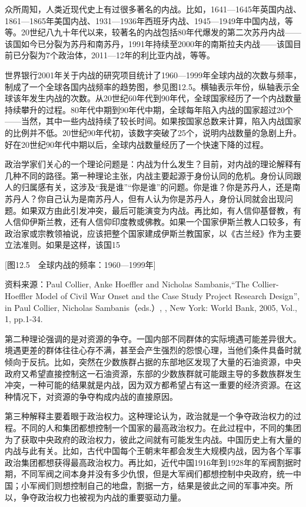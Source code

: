 众所周知，人类近现代史上有过很多著名的内战。比如，1641—1645年英国内战、1861—1865年美国内战、1931—1936年西班牙内战、1945—1949年中国内战，等等。20世纪八九十年代以来，较著名的内战包括80年代爆发的第二次苏丹内战——该国如今已分裂为苏丹和南苏丹，1991年持续至2000年的南斯拉夫内战——该国目前已分裂为7个政治体，2011—12年的利比亚内战，等等。

世界银行2001年关于内战的研究项目统计了1960—1999年全球内战的次数与频率，制成了一个全球各国内战频率的趋势图，参见图12.5。横轴表示年份，纵轴表示全球该年发生内战的次数。从20世纪60年代到90年代，全球国家经历了一个内战数量持续攀升的过程。80年代中期到90年代中期，全球每年陷入内战的国家超过20个——当然，其中一些内战持续了较长时间。如果按国家总数来计算，陷入内战国家的比例并不低。20世纪90年代初，该数字突破了25个，说明内战数量的急剧上升。好在20世纪90年代中期以后，全球内战数量经历了一个快速下降的过程。

政治学家们关心的一个理论问题是：内战为什么发生？目前，对内战的理论解释有几种不同的路径。第一种理论主张，内战主要起源于身份认同的危机。身份认同跟人的归属感有关，这涉及“我是谁”“你是谁”的问题。你是谁？你是苏丹人，还是南苏丹人？你自己认为是南苏丹人，但有人认为你是苏丹人，身份认同就会出现问题。如果双方由此引发冲突，最后可能演变为内战。再比如，有人信仰基督教，有人信仰伊斯兰教，还有人信仰印度教或佛教。如果一个国家伊斯兰教人口较多，有政治家或宗教领袖说，应该把整个国家建成伊斯兰教国家，以《古兰经》作为主要立法准则。如果是这样，该国15%

[图12.5　全球内战的频率：1960—1999年]

资料来源：Paul Collier, Anke Hoeffler and Nicholas Sambanis,“The Collier-Hoeffler Model of Civil War Onset and the Case Study Project Research Design”, in Paul Collier, Nicholas Sambanis（eds.）, , New York: World Bank, 2005, Vol., 1, pp.1-34.

第二种理论强调的是对资源的争夺。一国内部不同群体的实际境遇可能差异很大。境遇更差的群体往往心存不满，甚至会产生强烈的怨恨心理，当他们条件具备时就倾向于反抗。比如，突然在少数族群占据的东部地区发现了大量的石油资源，中央政府又希望直接控制这一石油资源，东部的少数族群就可能跟主导的多数族群发生冲突，一种可能的结果就是内战，因为双方都希望占有这一重要的经济资源。在这种情况下，对资源的争夺构成内战的直接原因。

第三种解释主要着眼于政治权力。这种理论认为，政治就是一个争夺政治权力的过程。不同的人和集团都想控制一个国家的最高政治权力。在此过程中，不同的集团为了获取中央政府的政治权力，彼此之间就有可能发生内战。中国历史上有大量的内战与此有关。比如，古代中国每个王朝末年都会发生大规模内战，因为各个军事政治集团都想获得最高政治权力。再比如，近代中国1916年到1928年的军阀割据时期，不同军阀之间本身并没有多少仇恨，但是大军阀们都想控制中央政府，统一中国；小军阀们则想控制自己的地盘，割据一方，结果是彼此之间的军事冲突。所以，争夺政治权力也被视为内战的重要驱动力量。

